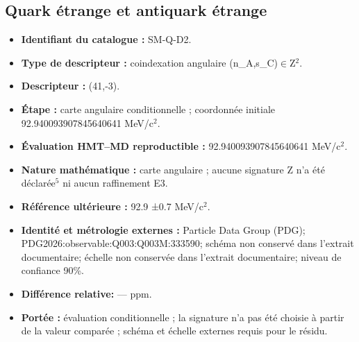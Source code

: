 \subsection{Quark étrange et antiquark étrange}
\begin{itemize}
\item \textbf{Identifiant du catalogue :} SM-Q-D2.
\item \textbf{Type de descripteur :} coindexation angulaire (n\_A,s\_C)\(\in\)Z\({}^{2}\).
\item \textbf{Descripteur :} (41,-3).
\item \textbf{Étape :} carte angulaire conditionnelle ; coordonnée initiale 92.940093\allowbreak{}907845\allowbreak{}640641 MeV/c\({}^{2}\).
\item \textbf{Évaluation HMT--MD reproductible :} 92.940093\allowbreak{}907845\allowbreak{}640641 MeV/c\({}^{2}\).
\item \textbf{Nature mathématique :} carte angulaire ; aucune signature Z n’a été déclarée\({}^{5}\) ni aucun raffinement E3.
\item \textbf{Référence ultérieure :} 92.9 ±\allowbreak{}0.7 MeV/c\({}^{2}\).
\item \textbf{Identité et métrologie externes :} Particle Data Group (PDG); PDG2026:\allowbreak{}observable:\allowbreak{}Q003:\allowbreak{}Q003M:\allowbreak{}333590; schéma non conservé dans l’extrait documentaire; échelle non conservée dans l’extrait documentaire; niveau de confiance 90\%.
\item \textbf{Différence relative:} --- ppm.
\item \textbf{Portée :} évaluation conditionnelle ; la signature n’a pas été choisie à partir de la valeur comparée ; schéma et échelle externes requis pour le résidu.
\end{itemize}
